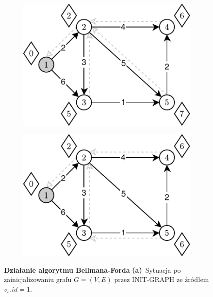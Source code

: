 \begin{figure}[!htbp]
\begin{subfigure}[b]{0.24\textwidth}
		\label{fig:exampleBellmanFord:b}
	\end{subfigure}
	\hfill
	\begin{subfigure}[b]{0.24\textwidth}
		\includegraphics[width=\textwidth]{Chapter_I/BELLMAN-FORD-Example/c.pdf}
		\caption{}
		\label{fig:exampleBellmanFord:c}
	\end{subfigure}
	\hfill
	\begin{subfigure}[b]{0.24\textwidth}
		\includegraphics[width=\textwidth]{Chapter_I/BELLMAN-FORD-Example/d.pdf}
		\caption{}
		\label{fig:exampleBellmanFord:d}
	\end{subfigure}
	\hfill\null
	\caption{
		\textbf{Działanie algorytmu Bellmana-Forda}
		\textbf{(a)}~Sytuacja po zainicjalizowaniu grafu $G = \left( V, E \right)$ przez \textsf{INIT-GRAPH} ze źródłem $v_{s}.id = 1$.
}
\end{figure}
